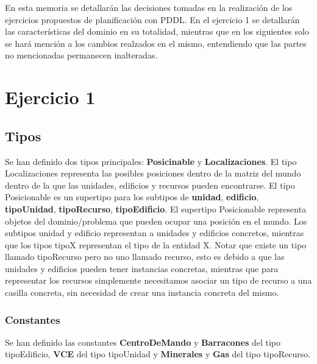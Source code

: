 En esta memoria se detallarán las decisiones tomadas en la realización de los ejercicios propuestos de planificación con PDDL. En el ejercicio 1 se detallarán las características del dominio en su totalidad, mientras que en los siguientes solo se hará mención a los cambios realzados en el mismo, entendiendo que las partes no mencionadas permanecen inalteradas.

\section{Ejercicio 1}
\subsection{Tipos}
Se han definido dos tipos principales: \textbf{Posicinable} y \textbf{Localizaciones}. El tipo Localizaciones representa las posibles posiciones dentro de la matriz del mundo dentro de la que las unidades, edificios y recursos pueden encontrarse. El tipo Posicionable es un supertipo para los subtipos de \textbf{unidad}, \textbf{edificio}, \textbf{tipoUnidad}, \textbf{tipoRecurso}, \textbf{tipoEdificio}. El supertipo Posicionable representa objetos del dominio/problema que pueden ocupar una posición en el mundo. Los subtipos unidad y edificio representan a unidades y edificios concretos, mientras que los tipos tipoX representan el tipo de la entidad X. Notar que existe un tipo llamado tipoRecurso pero no uno llamado recurso, esto es debido a que las unidades y edificios pueden tener instancias concretas, mientras que para representar los recursos simplemente necesitamos asociar un tipo de recurso a una casilla concreta, sin necesidad de crear una instancia concreta del mismo.

\subsubsection{Constantes}
Se han definido las constantes \textbf{CentroDeMando} y \textbf{Barracones} del tipo tipoEdificio, \textbf{VCE} del tipo tipoUnidad y \textbf{Minerales} y \textbf{Gas} del tipo tipoRecurso.

